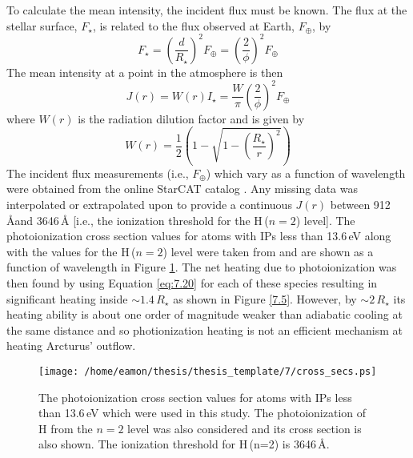 To calculate the mean intensity, the incident flux must be known. The flux at the stellar surface, $F_{\star}$, is related to the flux observed at Earth, $F_{\oplus}$, by
\begin{equation}
F_{\star}= \left(\frac{d}{R_{\star}}\right)^2F_{\oplus}=\left(\frac{2}{\phi}\right)^2F_{\oplus}
\end{equation}
The mean intensity at a point in the atmosphere is then
\begin{equation}
J(r)=W(r)I_{\star} =\frac{W}{\pi}\left(\frac{2}{\phi}\right)^2F_{\oplus}
\end{equation}
where $W(r)$ is the radiation dilution factor and is given by
\begin{equation}
W(r)=\frac{1}{2}\left(1 - \sqrt{1-\left(\frac{R_{\star}}{r}\right)^2} \right)
\end{equation}
The incident flux measurements (i.e., $F_{\oplus}$) which vary as a function of wavelength were obtained from the online StarCAT catalog \citep{ayres_2010}. Any missing data was interpolated or extrapolated upon to provide a continuous $J(r)$ between 912\,\AA and 3646\,\AA\,\,[i.e., the ionization threshold for the H\,($n=2$) level]. The photoionization cross section values for atoms with IPs less than 13.6\,eV along with the values for the H\,($n=2$) level were taken from \cite{mathisen_1984} and are shown as a function of wavelength in Figure \ref{fig:7.3}. The net heating due to photoionization was then found by using Equation \ref{eq:7.20} for each of these species resulting in significant heating inside $\sim 1.4\,R_{\star}$ as shown in Figure \ref{7.5}. However, by $\sim 2\,R_{\star}$ its heating ability is about one order of magnitude weaker than adiabatic cooling at the same distance and so photionization heating is not an efficient mechanism at heating Arcturus' outflow.
\begin{figure}[!ht]
\centering 
         \texttt{[image: /home/eamon/thesis/thesis\_template/7/cross\_secs.ps]}
\caption[]{The photoionization cross section values for atoms with IPs less than 13.6\,eV which were used in this study. The photoionization of H from the $n=2$ level was also considered and its cross section is also shown. The ionization threshold for H\,(n=2) is 3646\,\AA .}
\label{fig:7.3}
\end{figure}

